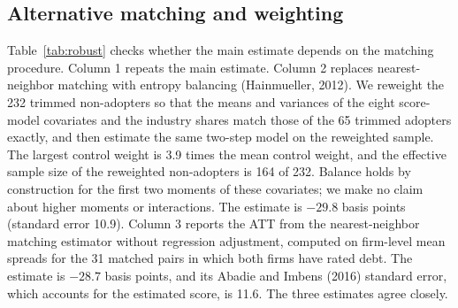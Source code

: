 \documentclass[11pt]{article}
\begin{document}
\subsection{Alternative matching and weighting}

Table~\ref{tab:robust} checks whether the main estimate depends on the matching procedure. Column 1 repeats the main estimate. Column 2 replaces nearest-neighbor matching with entropy balancing (Hainmueller, 2012). We reweight the 232 trimmed non-adopters so that the means and variances of the eight score-model covariates and the industry shares match those of the 65 trimmed adopters exactly, and then estimate the same two-step model on the reweighted sample. The largest control weight is 3.9 times the mean control weight, and the effective sample size of the reweighted non-adopters is 164 of 232. Balance holds by construction for the first two moments of these covariates; we make no claim about higher moments or interactions. The estimate is $-29.8$ basis points (standard error 10.9). Column 3 reports the ATT from the nearest-neighbor matching estimator without regression adjustment, computed on firm-level mean spreads for the 31 matched pairs in which both firms have rated debt. The estimate is $-28.7$ basis points, and its Abadie and Imbens (2016) standard error, which accounts for the estimated score, is 11.6. The three estimates agree closely.
\end{document}
